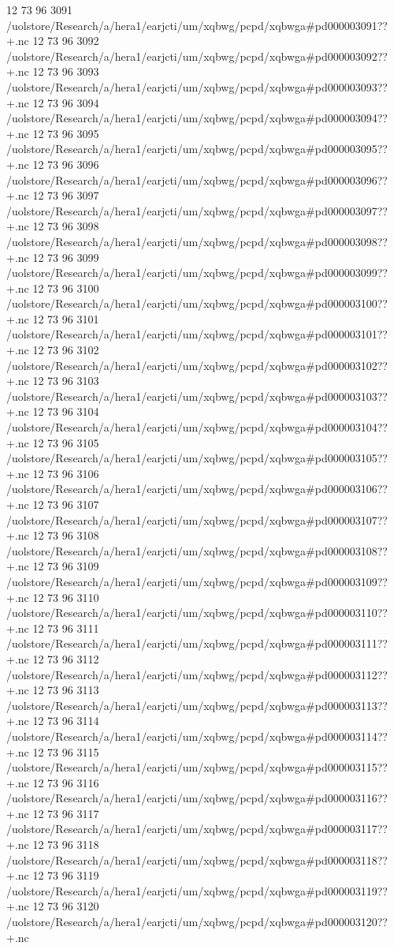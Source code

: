 12 73 96
3091
/uolstore/Research/a/hera1/earjcti/um/xqbwg/pcpd/xqbwga#pd000003091??+.nc
12 73 96
3092
/uolstore/Research/a/hera1/earjcti/um/xqbwg/pcpd/xqbwga#pd000003092??+.nc
12 73 96
3093
/uolstore/Research/a/hera1/earjcti/um/xqbwg/pcpd/xqbwga#pd000003093??+.nc
12 73 96
3094
/uolstore/Research/a/hera1/earjcti/um/xqbwg/pcpd/xqbwga#pd000003094??+.nc
12 73 96
3095
/uolstore/Research/a/hera1/earjcti/um/xqbwg/pcpd/xqbwga#pd000003095??+.nc
12 73 96
3096
/uolstore/Research/a/hera1/earjcti/um/xqbwg/pcpd/xqbwga#pd000003096??+.nc
12 73 96
3097
/uolstore/Research/a/hera1/earjcti/um/xqbwg/pcpd/xqbwga#pd000003097??+.nc
12 73 96
3098
/uolstore/Research/a/hera1/earjcti/um/xqbwg/pcpd/xqbwga#pd000003098??+.nc
12 73 96
3099
/uolstore/Research/a/hera1/earjcti/um/xqbwg/pcpd/xqbwga#pd000003099??+.nc
12 73 96
3100
/uolstore/Research/a/hera1/earjcti/um/xqbwg/pcpd/xqbwga#pd000003100??+.nc
12 73 96
3101
/uolstore/Research/a/hera1/earjcti/um/xqbwg/pcpd/xqbwga#pd000003101??+.nc
12 73 96
3102
/uolstore/Research/a/hera1/earjcti/um/xqbwg/pcpd/xqbwga#pd000003102??+.nc
12 73 96
3103
/uolstore/Research/a/hera1/earjcti/um/xqbwg/pcpd/xqbwga#pd000003103??+.nc
12 73 96
3104
/uolstore/Research/a/hera1/earjcti/um/xqbwg/pcpd/xqbwga#pd000003104??+.nc
12 73 96
3105
/uolstore/Research/a/hera1/earjcti/um/xqbwg/pcpd/xqbwga#pd000003105??+.nc
12 73 96
3106
/uolstore/Research/a/hera1/earjcti/um/xqbwg/pcpd/xqbwga#pd000003106??+.nc
12 73 96
3107
/uolstore/Research/a/hera1/earjcti/um/xqbwg/pcpd/xqbwga#pd000003107??+.nc
12 73 96
3108
/uolstore/Research/a/hera1/earjcti/um/xqbwg/pcpd/xqbwga#pd000003108??+.nc
12 73 96
3109
/uolstore/Research/a/hera1/earjcti/um/xqbwg/pcpd/xqbwga#pd000003109??+.nc
12 73 96
3110
/uolstore/Research/a/hera1/earjcti/um/xqbwg/pcpd/xqbwga#pd000003110??+.nc
12 73 96
3111
/uolstore/Research/a/hera1/earjcti/um/xqbwg/pcpd/xqbwga#pd000003111??+.nc
12 73 96
3112
/uolstore/Research/a/hera1/earjcti/um/xqbwg/pcpd/xqbwga#pd000003112??+.nc
12 73 96
3113
/uolstore/Research/a/hera1/earjcti/um/xqbwg/pcpd/xqbwga#pd000003113??+.nc
12 73 96
3114
/uolstore/Research/a/hera1/earjcti/um/xqbwg/pcpd/xqbwga#pd000003114??+.nc
12 73 96
3115
/uolstore/Research/a/hera1/earjcti/um/xqbwg/pcpd/xqbwga#pd000003115??+.nc
12 73 96
3116
/uolstore/Research/a/hera1/earjcti/um/xqbwg/pcpd/xqbwga#pd000003116??+.nc
12 73 96
3117
/uolstore/Research/a/hera1/earjcti/um/xqbwg/pcpd/xqbwga#pd000003117??+.nc
12 73 96
3118
/uolstore/Research/a/hera1/earjcti/um/xqbwg/pcpd/xqbwga#pd000003118??+.nc
12 73 96
3119
/uolstore/Research/a/hera1/earjcti/um/xqbwg/pcpd/xqbwga#pd000003119??+.nc
12 73 96
3120
/uolstore/Research/a/hera1/earjcti/um/xqbwg/pcpd/xqbwga#pd000003120??+.nc
